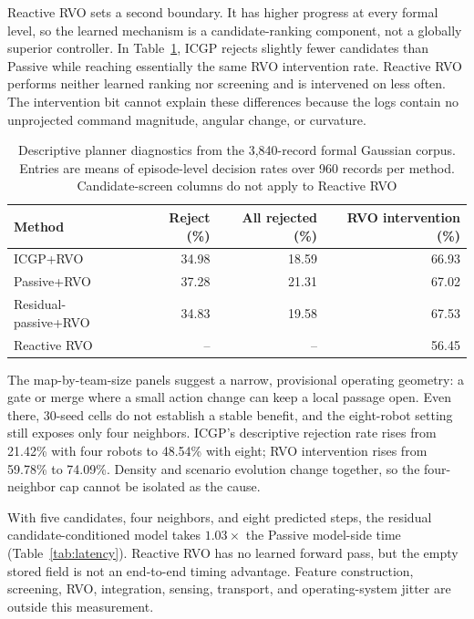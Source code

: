\documentclass[pdflatex,sn-mathphys-num]{sn-jnl}
\begin{document}
Reactive RVO sets a second boundary. It has higher progress at every formal level, so the learned mechanism is a candidate-ranking component, not a globally superior controller. In Table~\ref{tab:planner-diagnostics}, ICGP rejects slightly fewer candidates than Passive while reaching essentially the same RVO intervention rate. Reactive RVO performs neither learned ranking nor screening and is intervened on less often. The intervention bit cannot explain these differences because the logs contain no unprojected command magnitude, angular change, or curvature.

\begin{table}[htbp]
\caption{Descriptive planner diagnostics from the 3,840-record formal Gaussian corpus. Entries are means of episode-level decision rates over 960 records per method. Candidate-screen columns do not apply to Reactive RVO}
\label{tab:planner-diagnostics}
\centering
\small
\begin{tabular}{@{}lrrr@{}}
\toprule
Method & Reject (\%) & All rejected (\%) & RVO intervention (\%) \\
\midrule
ICGP+RVO & 34.98 & 18.59 & 66.93 \\
Passive+RVO & 37.28 & 21.31 & 67.02 \\
Residual-passive+RVO & 34.83 & 19.58 & 67.53 \\
Reactive RVO & -- & -- & 56.45 \\
\bottomrule
\end{tabular}
\end{table}

The map-by-team-size panels suggest a narrow, provisional operating geometry: a gate or merge where a small action change can keep a local passage open. Even there, 30-seed cells do not establish a stable benefit, and the eight-robot setting still exposes only four neighbors. ICGP's descriptive rejection rate rises from 21.42\% with four robots to 48.54\% with eight; RVO intervention rises from 59.78\% to 74.09\%. Density and scenario evolution change together, so the four-neighbor cap cannot be isolated as the cause.

With five candidates, four neighbors, and eight predicted steps, the residual candidate-conditioned model takes $1.03\times$ the Passive model-side time (Table~\ref{tab:latency}). Reactive RVO has no learned forward pass, but the empty stored field is not an end-to-end timing advantage. Feature construction, screening, RVO, integration, sensing, transport, and operating-system jitter are outside this measurement.
\end{document}
